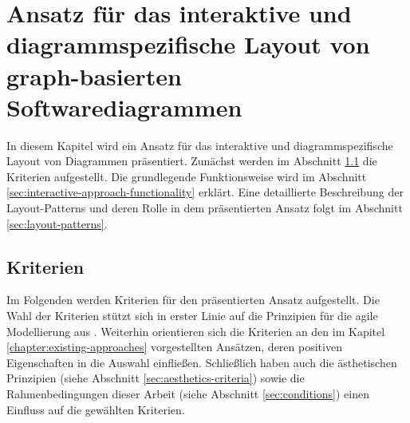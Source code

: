 
\chapter{Ansatz für das interaktive und diagrammspezifische Layout von graph-basierten Softwarediagrammen}
\label{chapter:interactive-approach}

In diesem Kapitel wird ein Ansatz für das interaktive und diagrammspezifische Layout von Diagrammen präsentiert. Zunächst werden im Abschnitt \ref{sec:requirements-analysis} die Kriterien aufgestellt. Die grundlegende Funktionsweise wird im Abschnitt \ref{sec:interactive-approach-functionality} erklärt. Eine detaillierte Beschreibung der Layout-Patterns und deren Rolle in dem präsentierten Ansatz folgt im Abschnitt \ref{sec:layout-patterns}.

\section{Kriterien}
\label{sec:requirements-analysis}

Im Folgenden werden Kriterien für den präsentierten Ansatz aufgestellt. Die Wahl der Kriterien stützt sich in erster Linie auf die Prinzipien für die agile Modellierung aus \cite{Ambler02Agile}. Weiterhin orientieren sich die Kriterien an den im Kapitel \ref{chapter:existing-approaches} vorgestellten Ansätzen, deren positiven Eigenschaften in die Auswahl einfließen.   Schließlich haben auch die ästhetischen Prinzipien (siehe Abschnitt \ref{sec:aesthetics-criteria}) sowie die Rahmenbedingungen dieser Arbeit (siehe Abschnitt \ref{sec:conditions}) einen Einfluss auf die gewählten Kriterien.

